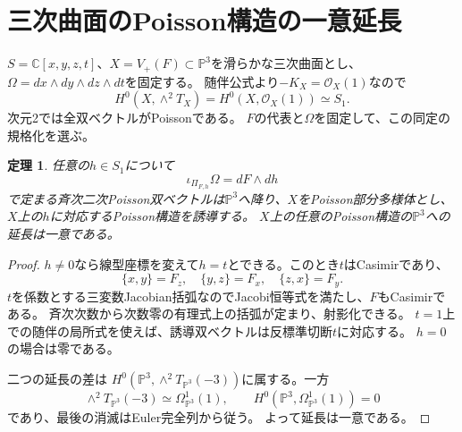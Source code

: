 \documentclass[11pt,a4paper]{ltjsarticle}
\newtheorem{theorem}{定理}[section]
\theoremstyle{definition}\newtheorem{remark}[theorem]{注意}
\newcommand{\PP}{\mathbb P}\newcommand{\kk}{\mathbb C}
\newcommand{\OO}{\mathcal O}\newcommand{\rank}{\operatorname{rank}}
\begin{document}


\section{三次曲面のPoisson構造の一意延長}
$S=\kk[x,y,z,t]$、$X=V_+(F)\subset\PP^3$を滑らかな三次曲面とし、
$\Omega=dx\wedge dy\wedge dz\wedge dt$を固定する。
随伴公式より$-K_X=\OO_X(1)$なので
\[
 H^0(X,\wedge^2T_X)=H^0(X,\OO_X(1))\simeq S_1.
\]
次元2では全双ベクトルがPoissonである。
$F$の代表と$\Omega$を固定して、この同定の規格化を選ぶ。

\begin{theorem}\label{thm:extension}
任意の$h\in S_1$について
\[
 \iota_{\Pi_{F,h}}\Omega=dF\wedge dh
\]
で定まる斉次二次Poisson双ベクトルは$\PP^3$へ降り、$X$をPoisson部分多様体とし、
$X$上の$h$に対応するPoisson構造を誘導する。
$X$上の任意のPoisson構造の$\PP^3$への延長は一意である。
\end{theorem}
\begin{proof}
$h\ne0$なら線型座標を変えて$h=t$とできる。このとき$t$はCasimirであり、
\[
 \{x,y\}=F_z,\quad\{y,z\}=F_x,\quad\{z,x\}=F_y.
\]
$t$を係数とする三変数Jacobian括弧なのでJacobi恒等式を満たし、$F$もCasimirである。
斉次次数から次数零の有理式上の括弧が定まり、射影化できる。
$t=1$上での随伴の局所式を使えば、誘導双ベクトルは反標準切断$t$に対応する。
$h=0$の場合は零である。

二つの延長の差は
$H^0(\PP^3,\wedge^2T_{\PP^3}(-3))$に属する。一方
\[
 \wedge^2T_{\PP^3}(-3)\simeq\Omega^1_{\PP^3}(1),\qquad
 H^0(\PP^3,\Omega^1_{\PP^3}(1))=0
\]
であり、最後の消滅はEuler完全列から従う。
よって延長は一意である。
\end{proof}
\end{document}
